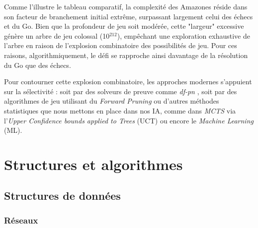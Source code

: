 \documentclass[11pt,a4paper,titlepage,oneside]{article}
\begin{document}
        Comme l'illustre le tableau comparatif, la complexité des Amazones réside dans son facteur de branchement initial extrême, surpassant largement celui des échecs et du Go. Bien que la profondeur de jeu soit modérée, cette "largeur" excessive génère un arbre de jeu colossal (10$^{212}$), empêchant une exploration exhaustive de l'arbre en raison de l'explosion combinatoire des possibilités de jeu. Pour ces raisons, algorithmiquement, le défi se rapproche ainsi davantage de la résolution du Go que des échecs.
        
        Pour contourner cette explosion combinatoire, les approches modernes s'appuient sur la sélectivité : soit par des solveurs de preuve comme \textit{df-pn} \cite{dfpn}, soit par des algorithmes de jeu utilisant du \textit{Forward Pruning} \cite{fpruning} ou d'autres méthodes statistiques que nous mettons en place dans nos IA, comme dans \textit{MCTS} via l'\textit{Upper Confidence bounds applied to Trees} (UCT) \cite{uct} ou encore le \textit{Machine Learning} (ML).

    \section{Structures et algorithmes}
    \subsection{Structures de données} 
    \subsubsection{Réseaux}
    
\end{document}
